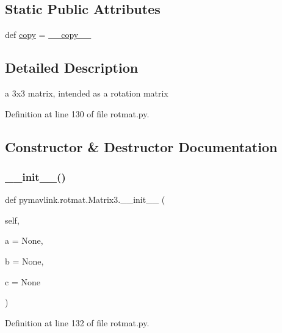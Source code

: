 \subsection*{Static Public Attributes}
\begin{DoxyCompactItemize}
\item 
def \mbox{\hyperlink{classpymavlink_1_1rotmat_1_1Matrix3_a2766663f4736ceabdd5f39d98dcfef7f}{copy}} = \mbox{\hyperlink{classpymavlink_1_1rotmat_1_1Matrix3_aaab43e8d595d0c4422b5561db2a0b89f}{\+\_\+\+\_\+copy\+\_\+\+\_\+}}
\end{DoxyCompactItemize}


\subsection{Detailed Description}
\begin{DoxyVerb}a 3x3 matrix, intended as a rotation matrix\end{DoxyVerb}
 

Definition at line 130 of file rotmat.\+py.



\subsection{Constructor \& Destructor Documentation}
\mbox{\label{classpymavlink_1_1rotmat_1_1Matrix3_abbd2600e17b922e8f1311dfdecd4ad10}} 
\subsubsection{\texorpdfstring{\_\_init\_\_()}{\_\_init\_\_()}}
{\footnotesize\ttfamily def pymavlink.\+rotmat.\+Matrix3.\+\_\+\+\_\+init\+\_\+\+\_\+ (\begin{DoxyParamCaption}\item[{}]{self,  }\item[{}]{a = {\ttfamily None},  }\item[{}]{b = {\ttfamily None},  }\item[{}]{c = {\ttfamily None} }\end{DoxyParamCaption})}



Definition at line 132 of file rotmat.\+py.



